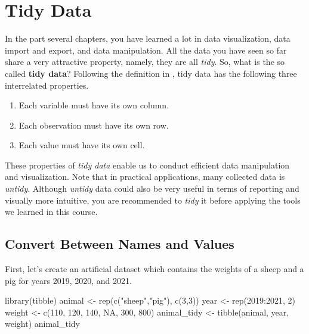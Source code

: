 \documentclass[
]{book}
\newenvironment{Shaded}{\begin{snugshade}}{\end{snugshade}}
\newcommand{\ConstantTok}[1]{\textcolor[rgb]{0.00,0.00,0.00}{#1}}
\newcommand{\DecValTok}[1]{\textcolor[rgb]{0.00,0.00,0.81}{#1}}
\newcommand{\FunctionTok}[1]{\textcolor[rgb]{0.00,0.00,0.00}{#1}}
\newcommand{\NormalTok}[1]{#1}
\newcommand{\OtherTok}[1]{\textcolor[rgb]{0.56,0.35,0.01}{#1}}
\newcommand{\SpecialCharTok}[1]{\textcolor[rgb]{0.00,0.00,0.00}{#1}}
\newcommand{\StringTok}[1]{\textcolor[rgb]{0.31,0.60,0.02}{#1}}
\providecommand{\tightlist}{%
  \setlength{\itemsep}{0pt}\setlength{\parskip}{0pt}}
\begin{document}
\hypertarget{tidy-data}{%
\chapter{Tidy Data}\label{tidy-data}}

In the part several chapters, you have learned a lot in data visualization, data import and export, and data manipulation. All the data you have seen so far share a very attractive property, namely, they are all \emph{tidy}. So, what is the so called \textbf{tidy data}? Following the definition in \citet{wickham2016r}, tidy data has the following three interrelated properties.

\begin{enumerate}
\def\labelenumi{\arabic{enumi}.}
\tightlist
\item
  Each variable must have its own column.
\item
  Each observation must have its own row.
\item
  Each value must have its own cell.
\end{enumerate}

These properties of \emph{tidy data} enable us to conduct efficient data manipulation and visualization. Note that in practical applications, many collected data is \emph{untidy}. Although \emph{untidy} data could also be very useful in terms of reporting and visually more intuitive, you are recommended to \emph{tidy} it before applying the tools we learned in this course.

\hypertarget{tidy-name-value}{%
\section{Convert Between Names and Values}\label{tidy-name-value}}

First, let's create an artificial dataset which contains the weights of a sheep and a pig for years 2019, 2020, and 2021.

\begin{Shaded}
\begin{Highlighting}[]
\FunctionTok{library}\NormalTok{(tibble)}
\NormalTok{animal }\OtherTok{\textless{}{-}} \FunctionTok{rep}\NormalTok{(}\FunctionTok{c}\NormalTok{(}\StringTok{"sheep"}\NormalTok{,}\StringTok{"pig"}\NormalTok{), }\FunctionTok{c}\NormalTok{(}\DecValTok{3}\NormalTok{,}\DecValTok{3}\NormalTok{))}
\NormalTok{year }\OtherTok{\textless{}{-}} \FunctionTok{rep}\NormalTok{(}\DecValTok{2019}\SpecialCharTok{:}\DecValTok{2021}\NormalTok{, }\DecValTok{2}\NormalTok{)}
\NormalTok{weight }\OtherTok{\textless{}{-}} \FunctionTok{c}\NormalTok{(}\DecValTok{110}\NormalTok{, }\DecValTok{120}\NormalTok{, }\DecValTok{140}\NormalTok{, }\ConstantTok{NA}\NormalTok{, }\DecValTok{300}\NormalTok{, }\DecValTok{800}\NormalTok{)}
\NormalTok{animal\_tidy }\OtherTok{\textless{}{-}} \FunctionTok{tibble}\NormalTok{(animal, year, weight)}
\NormalTok{animal\_tidy}
\end{Highlighting}
\end{Shaded}
\end{document}
